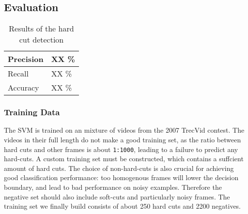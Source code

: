 \subsection{Evaluation}
\label{sec:hard_cut_evaluation}

\begin{table}[ht]
	\centering
	\begin{tabular}{l|l}
	Precision & XX \% \\ \hline
	Recall & XX \% \\ \hline
	Accuracy & XX \% \\
	\end{tabular}
	\caption{Results of the hard cut detection}
	\label{tab:hard_cut_results}
\end{table}

\subsubsection{Training Data}
The SVM is trained on an mixture of videos from the 2007 TrecVid contest.
The videos in their full length do not make a good training set, as the ratio between hard cuts and other frames is about \texttt{1:1000}, leading to a failure to predict any hard-cuts.
A custom training set must be constructed, which contains a suffcient amount of hard cuts.
The choice of non-hard-cuts is also crucial for achieving good classification performance: too homogenous frames will lower the decision boundary, and lead to bad performance on noisy examples.
Therefore the negative set should also include soft-cuts and particularly noisy frames.
The training set we finally build consists of about 250 hard cuts and 2200 negatives.
